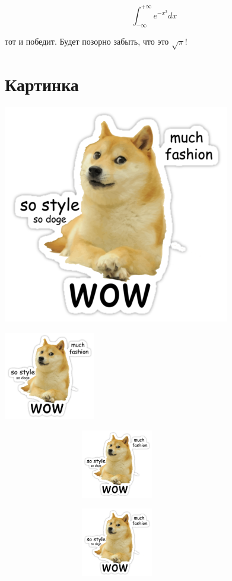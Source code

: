 \documentclass[12pt, a4paper]{article}  %
\begin{document}
\[ \int_{-\infty}^{+\infty} e^{-x^2} dx \] 

тот и победит. Будет позорно забыть, что это $\sqrt{\pi}$!



\section{Картинка} 

\includegraphics[scale=0.2]{doge.png}

\includegraphics[width=0.3\textwidth]{doge.png}

\includegraphics[height=3cm,width=10cm]{doge.png}

\includegraphics[height=3cm,width=10cm,keepaspectratio]{doge.png}
\end{document}
